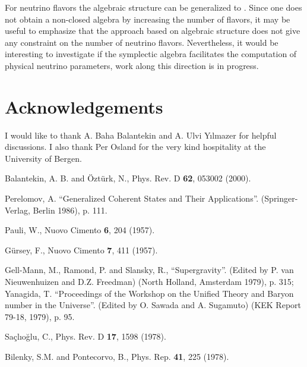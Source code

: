 \documentclass[a4paper,12pt]{article}
\begin{document}
For \coordHE{} neutrino flavors the algebraic 
structure can be generalized to \coordHE{}. Since one does not obtain a 
non-closed algebra 
by increasing the number of flavors, it may be useful to emphasize that 
the approach based on algebraic structure does not give 
any constraint on the number of neutrino flavors. Nevertheless, it 
would be interesting to investigate if the symplectic algebra 
facilitates the computation of physical neutrino parameters, 
work along this direction is in progress.

\section*{Acknowledgements}

I would like to thank A. Baha Balantekin and A. Ulvi Y{\i}lmazer 
for helpful discussions. I also thank Per Osland for 
the very kind hospitality at the University of Bergen.
\begin{thebibliography}{10}
Balantekin, A. B. and \"{O}zt\"{u}rk, N., Phys. Rev. D {\bf 62}, 053002 
(2000).

Perelomov, A. ``Generalized Coherent States and Their Applications''. 
(Springer-Verlag, Berlin 1986), p. 111.

Pauli, W., Nuovo Cimento {\bf 6}, 204 (1957). 

G\"{u}rsey, F., Nuovo Cimento {\bf 7}, 411 (1957).

Gell-Mann, M., Ramond, P. and Slansky, R., ``Supergravity''. (Edited by 
P. van Nieuwenhuizen and D.Z. Freedman) (North Holland, Amsterdam 1979), 
p. 315; Yanagida, T. ``Proceedings of the Workshop on the Unified Theory and 
Baryon number in the Universe''. (Edited by O. Sawada and A. Sugamuto) 
(KEK Report 79-18, 1979), p. 95.

Sa\c{c}l{\i}o\u{g}lu, C., Phys. Rev. D {\bf 17}, 1598 (1978).

Bilenky, S.M. and Pontecorvo, B., Phys. Rep. {\bf 41}, 225 (1978).
\end{thebibliography}
\end{document}
